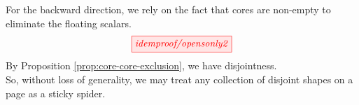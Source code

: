 \begin{myboxR}
For the backward direction, we rely on the fact that cores are non-empty to eliminate the floating scalars.
\[\scalebox{1}{\tikzfig{idemproof/opensonly2}}\]
By Proposition \ref{prop:core-core-exclusion}, we have disjointness.\\

So, without loss of generality, we may treat any collection of disjoint shapes on a page as a sticky spider.
\end{myboxR}

\clearpage